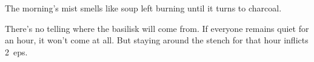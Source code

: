 \begin{boxtext}
  The morning's mist smells like soup left burning until it turns to charcoal.
\end{boxtext}

\basilisk

There's no telling where the \gls{basilisk} will come from.
If everyone remains quiet for an hour, it won't come at all.
But staying around the stench for that hour inflicts 2~\glspl{ep}.
